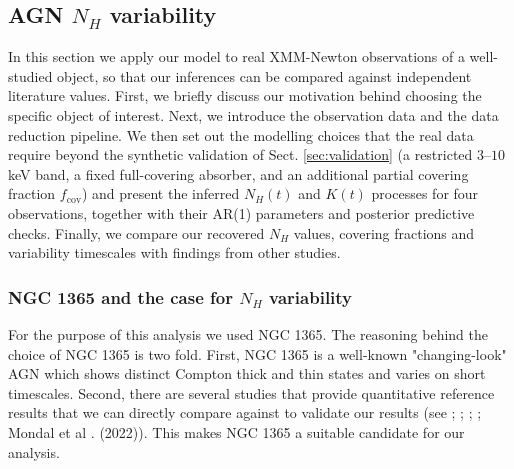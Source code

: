\documentclass{aa}
\begin{document}
\subsection{AGN $N_H$ variability}
In this section we apply our model to real XMM-Newton observations of a well-studied
object, so that our inferences can be compared against independent literature values.
First, we briefly discuss our motivation behind choosing the specific object of
interest. Next, we introduce the observation data and the data reduction pipeline. We
then set out the modelling choices that the real data require beyond the synthetic
validation of Sect. \ref{sec:validation} (a restricted $3$--$10$ keV band, a fixed
full-covering absorber, and an additional partial covering fraction
$f_{\mathrm{cov}}$) and present the inferred $N_H(t)$ and $K(t)$ processes for four
observations, together with their AR(1) parameters and posterior predictive checks.
Finally, we compare our recovered $N_H$ values, covering fractions and variability
timescales with findings from other studies. \\
\subsubsection{NGC 1365 and the case for $N_H$ variability}
\label{sec:ngc1365}
For the purpose of this analysis we used NGC 1365. The reasoning behind the choice of NGC 1365 is two fold. First, NGC 1365 is a well-known "changing-look" AGN which shows distinct Compton thick and thin states and varies on short timescales. Second, there are several studies that provide quantitative reference results that we can directly compare against to validate our results (see \citet{Risaliti2005}; \citet{Braito2014}; \citet{Rivers2015}; \citet{Liu2021}; Mondal et al . (2022)). This makes NGC 1365 a suitable candidate for our analysis. \\
\end{document}

